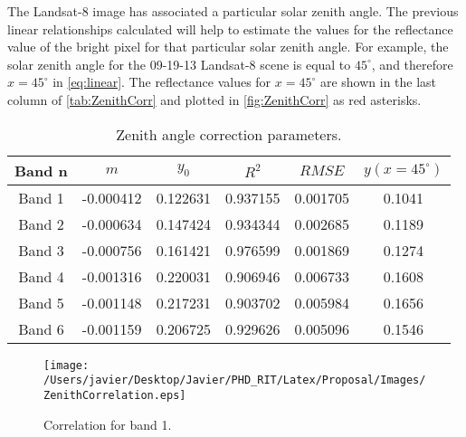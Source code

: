 The Landsat-8 image has associated a particular solar zenith angle. The previous linear relationships calculated will help to estimate the values for the reflectance value of the bright pixel for that particular solar zenith angle. For example, the solar zenith angle for the 09-19-13 Landsat-8 scene is equal to $45^\circ$, and therefore $x=45^\circ$ in \autoref{eq:linear}. The reflectance values for $x=45^\circ$ are shown in the last column of \autoref{tab:ZenithCorr} and plotted in \autoref{fig:ZenithCorr} as red asterisks.
\begin{table}[htb]
\caption{ Zenith angle correction parameters. \label{tab:ZenithCorr} } 
\centering
\begin{tabular}{c|c|c|c|c|c} 
 \bfseries{Band n} & \bfseries{$m$}      & \bfseries{$y_0$}    & \bfseries{$R^2$}     & \bfseries{$RMSE$} & $y(x=45^\circ)$   \\ \hline \hline
 Band 1 & -0.000412 & 0.122631 & 0.937155 & 0.001705 &  0.1041\\
 Band 2 & -0.000634 & 0.147424 & 0.934344 & 0.002685 &  0.1189\\
 Band 3 & -0.000756 & 0.161421 & 0.976599 & 0.001869 &  0.1274\\
 Band 4 & -0.001316 & 0.220031 & 0.906946 & 0.006733 &  0.1608\\
 Band 5 & -0.001148 & 0.217231 & 0.903702 & 0.005984 &  0.1656\\
 Band 6 & -0.001159 & 0.206725 & 0.929626 & 0.005096 &  0.1546\\  
 \end{tabular}
\end{table}

\begin{figure}[htb]
  	\centering
  	\texttt{[image: /Users/javier/Desktop/Javier/PHD\_RIT/Latex/Proposal/Images/ZenithCorrelation.eps]}
  \caption{Correlation for band 1. \label{fig:Band1Corr} } 
\end{figure}

